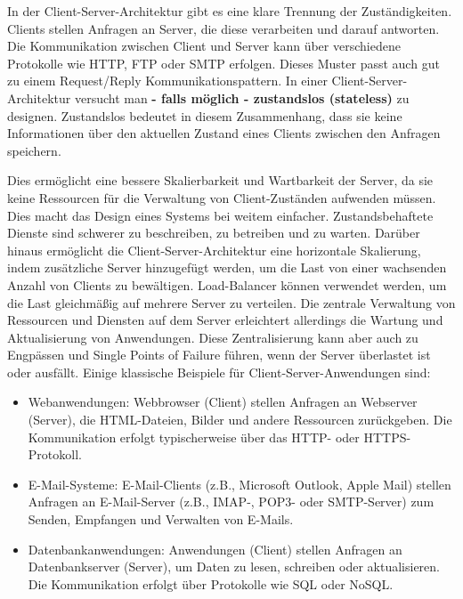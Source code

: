 \documentclass[../vs-script-first-v01.tex]{subfiles}
\begin{document}
In der Client-Server-Architektur gibt es eine klare Trennung der Zuständigkeiten. Clients stellen Anfragen an Server, die diese verarbeiten und darauf antworten. Die Kommunikation zwischen Client und Server kann über verschiedene Protokolle wie HTTP, FTP oder SMTP erfolgen. Dieses Muster passt auch gut zu einem Request/Reply Kommunikationspattern. 
In einer Client-Server-Architektur versucht man \textbf{- falls möglich - zustandslos (stateless)} zu designen. Zustandslos bedeutet in diesem Zusammenhang, dass sie keine Informationen über den aktuellen Zustand eines Clients zwischen den Anfragen speichern. 


Dies ermöglicht eine bessere Skalierbarkeit und Wartbarkeit der Server, da sie keine Ressourcen für die Verwaltung von Client-Zuständen aufwenden müssen. Dies macht das Design eines Systems bei weitem einfacher. Zustandsbehaftete Dienste sind schwerer zu beschreiben, zu betreiben und zu warten. 
Darüber hinaus ermöglicht die Client-Server-Architektur eine horizontale Skalierung, indem zusätzliche Server hinzugefügt werden, um die Last von einer wachsenden Anzahl von Clients zu bewältigen. Load-Balancer können verwendet werden, um die Last gleichmäßig auf mehrere Server zu verteilen.
Die zentrale Verwaltung von Ressourcen und Diensten auf dem Server erleichtert allerdings die Wartung und Aktualisierung von Anwendungen. Diese Zentralisierung kann aber auch zu Engpässen und Single Points of Failure führen, wenn der Server überlastet ist oder ausfällt. Einige klassische Beispiele für Client-Server-Anwendungen sind:
\begin{itemize}
\item Webanwendungen: Webbrowser (Client) stellen Anfragen an Webserver (Server), die HTML-Dateien, Bilder und andere Ressourcen zurückgeben. Die Kommunikation erfolgt typischerweise über das HTTP- oder HTTPS-Protokoll.
\item E-Mail-Systeme: E-Mail-Clients (z.B., Microsoft Outlook, Apple Mail) stellen Anfragen an E-Mail-Server (z.B., IMAP-, POP3- oder SMTP-Server) zum Senden, Empfangen und Verwalten von E-Mails.
\item Datenbankanwendungen: Anwendungen (Client) stellen Anfragen an Datenbankserver (Server), um Daten zu lesen, schreiben oder aktualisieren. Die Kommunikation erfolgt über Protokolle wie SQL oder NoSQL.
\end{itemize}
\end{document}
